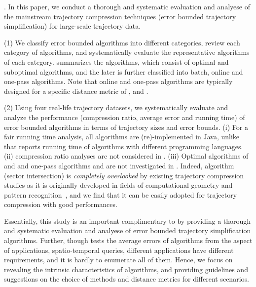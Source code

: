 




.
In this paper, we conduct a thorough and systematic evaluation and analyese of the mainstream trajectory compression techniques (\ie  error bounded trajectory simplification) for large-scale trajectory data.

\sstab (1) We classify error bounded \lsa algorithms into different categories, review each category of algorithms, and systematically evaluate the representative algorithms of each category.
%
 summarizes the algorithms, which consist of
optimal and suboptimal algorithms, and the later is further classified into batch, online and one-pass algorithms.
Note that online and one-pass algorithms are typically designed for a specific distance metric of \ped, \sed and \dad.

\sstab (2) Using four real-life trajectory datasets, we systematically evaluate and analyze the performance (compression ratio, average error and running
time) of error bounded \lsa algorithms in terms of trajectory sizes and error bounds.
%
(i) For a fair running time analysis, all algorithms are (re)-implemented in Java, unlike \cite{Zhang:Evaluation} that reports running time of algorithms with different programming languages. (ii) compression ratio analyses are not considered in \cite{Zhang:Evaluation}. (iii) Optimal algorithms of \ped and \sed and one-pass algorithms \siped and \cised are not investigated in \cite{Zhang:Evaluation}. Indeed, algorithm \siped (sector intersection) is {\em completely overlooked} by existing trajectory compression studies as it is originally developed in fields of computational geometry and pattern recognition~\cite{Williams:Longest,Sklansky:Cone,Dunham:Cone, Zhao:Sleeve}, and we find that it can be easily adopted for trajectory compression with good performances.


 Essentially, this study is an important complimentary to \cite{Zhang:Evaluation} by  providing a thorough and systematic evaluation and analyese of error bounded trajectory simplification algorithms. Further, though  \cite{Zhang:Evaluation}  tests the average errors of algorithms from the aspect
of applications, \ie spatio-temporal queries,  different applications have different requirements, and it is hardly to enumerate all of them.  Hence, we focus on revealing the intrinsic characteristics of algorithms, and providing guidelines and suggestions on the choice of methods and distance metrics for different scenarios.

